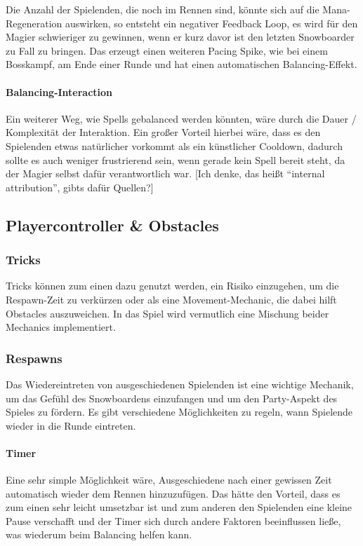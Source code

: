 Die Anzahl der Spielenden, die noch im Rennen sind, könnte sich auf die Mana-Regeneration auswirken, so entsteht ein negativer Feedback Loop, es wird für den Magier schwieriger zu gewinnen, wenn er kurz davor ist den letzten Snowboarder zu Fall zu bringen. Das erzeugt einen weiteren Pacing Spike, wie bei einem Bosskampf, am Ende einer Runde und hat einen automatischen Balancing\cite[S. 296]{_game_design_workshop}-Effekt.

\paragraph{Balancing-Interaction}
Ein weiterer Weg, wie Spells gebalanced werden könnten, wäre durch die Dauer / Komplexität der Interaktion. Ein großer Vorteil hierbei wäre, dass es den Spielenden etwas natürlicher vorkommt als ein künstlicher Cooldown, dadurch sollte es auch weniger frustrierend sein, wenn gerade kein Spell bereit steht, da der Magier selbst dafür verantwortlich war. [Ich denke, das heißt "`internal attribution"', gibts dafür Quellen?]

\subsection{Playercontroller \& Obstacles\label{_playercontroller}}
\subsubsection{Tricks}
Tricks können zum einen dazu genutzt werden, ein Risiko einzugehen, um die Respawn-Zeit zu verkürzen oder als eine Movement-Mechanic, die dabei hilft Obstacles auszuweichen. In das Spiel wird vermutlich eine Mischung beider Mechanics implementiert.

\subsubsection{Respawns}
Das Wiedereintreten von ausgeschiedenen Spielenden ist eine wichtige Mechanik, um das Gefühl des Snowboardens einzufangen und um den Party-Aspekt des Spieles zu fördern. Es gibt verschiedene Möglichkeiten zu regeln, wann Spielende wieder in die Runde eintreten.

\paragraph{Timer}
Eine sehr simple Möglichkeit wäre, Ausgeschiedene nach einer gewissen Zeit automatisch wieder dem Rennen hinzuzufügen. Das hätte den Vorteil, dass es zum einen sehr leicht umsetzbar ist und zum anderen den Spielenden eine kleine Pause verschafft und der Timer sich durch andere Faktoren beeinflussen ließe, was wiederum beim Balancing helfen kann.

